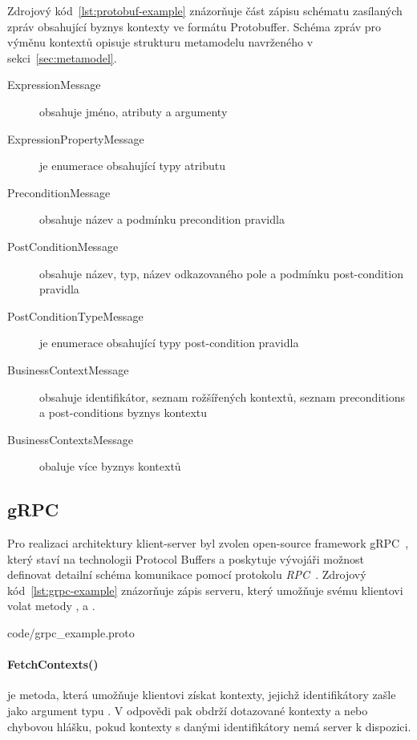 Zdrojový kód~\ref{lst:protobuf-example} znázorňuje část zápisu schématu
zasílaných zpráv obsahující byznys kontexty ve formátu Protobuffer.
Schéma zpráv pro výměnu kontextů opisuje strukturu metamodelu navrženého
v sekci~\ref{sec:metamodel}.

\begin{description}
    \item [ExpressionMessage] obsahuje jméno, atributy a argumenty 
    \item [ExpressionPropertyMessage] je enumerace obsahující typy atributu 
    \item [PreconditionMessage] obsahuje název a podmínku precondition pravidla
    \item [PostConditionMessage] obsahuje název, typ, název odkazovaného pole a podmínku post-condition pravidla
    \item [PostConditionTypeMessage] je enumerace obsahující typy post-condition pravidla
    \item [BusinessContextMessage] obsahuje identifikátor, seznam rožšířených kontextů, seznam preconditions a post-conditions byznys kontextu
    \item [BusinessContextsMessage] obaluje více byznys kontextů
\end{description}

\subsection{gRPC}

Pro realizaci architektury klient-server byl zvolen
open-source framework gRPC~\cite{grpcio}, který staví
na technologii Protocol Buffers a poskytuje vývojáři
možnost definovat detailní schéma komunikace pomocí
protokolu \textit{\gls{RPC}}~\cite{nelson1981remote}.
Zdrojový kód~\ref{lst:grpc-example} znázorňuje zápis serveru,
který umožňuje svému klientovi volat metody ,
 a .


{code/grpc_example.proto}

\paragraph{FetchContexts()} je metoda, která umožňuje klientovi
získat kontexty, jejichž identifikátory zašle jako argument
typu .
V odpovědi pak obdrží dotazované kontexty a nebo chybovou hlášku,
pokud kontexty s danými identifikátory nemá server k dispozici.

